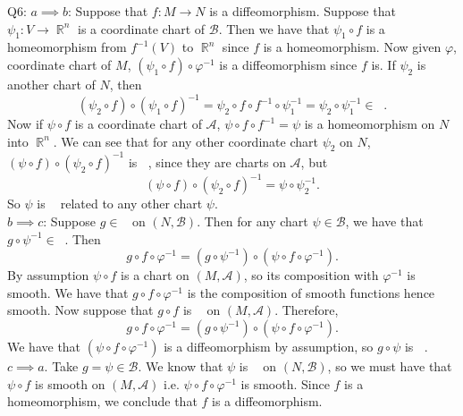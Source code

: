 \documentclass[letterpaper]{article}
\DeclareMathOperator{\smooth}{\mathcal{C}^\infty}
\DeclareMathOperator{\R}{\mathbb{R}}
\begin{document}
 \noindent Q6: 
$a \implies b$: Suppose that $f:M\to N$ is a diffeomorphism.
 Suppose that $\psi_1 : V \to \R^n$ is a coordinate chart of $\mathcal{B}$. 
 Then we have that $\psi_1\circ f$ is a homeomorphism from $f^{-1}(V)$ to $\R^n$ since $f$ is a homeomorphism.
Now given $\varphi$, coordinate chart of $M$, $(\psi_1 \circ f) \circ \varphi^{-1}$ is a diffeomorphism since $f$ is.  
If $\psi_2$ is another chart of $N$, then $$(\psi_2 \circ f) \circ (\psi_1\circ f)^{-1} = \psi_2 \circ f \circ f^{-1} \circ \psi_1^{-1} = \psi_2 \circ \psi_1^{-1}\in \smooth.$$
Now if $\psi\circ f$ is a coordinate chart of $\mathcal{A}$, $\psi \circ f \circ f^{-1} = \psi$ is a homeomorphism on $N$ into $\R^n$. 
We can see that for any other coordinate chart $\psi_2$ on $N$, $(\psi\circ f)\circ(\psi_2 \circ f)^{-1}$ is $\smooth$, since they are charts on $\mathcal{A}$, but $$(\psi\circ f)\circ(\psi_2 \circ f)^{-1} = \psi \circ \psi_2^{-1}.$$ 
So $\psi$ is $\smooth$ related to any other chart $\psi$. 
\newline \\ $b \implies c$: Suppose $g \in \smooth$ on $(N, \mathcal{B})$. Then for any chart $\psi\in \mathcal{B}$, we have that $g\circ \psi^{-1} \in \smooth$. Then $$g\circ f \circ \varphi^{-1} = (g\circ \psi^{-1}) \circ (\psi \circ f \circ \varphi^{-1}).$$ By assumption $\psi \circ f$ is a chart on $(M , \mathcal{A})$, so its composition with $\varphi^{-1}$ is smooth. 
We have that $g\circ f \circ \varphi^{-1}$ is the composition of smooth functions hence smooth. Now suppose that $g\circ f$ is $\smooth$ on $(M, \mathcal{A})$. 
Therefore, $$g \circ f \circ \varphi^{-1} = (g \circ \psi^{-1}) \circ ( \psi \circ f \circ \varphi^{-1}). $$ We have that $( \psi \circ f \circ \varphi^{-1})$ is a diffeomorphism by assumption, so $g\circ \psi$ is $\smooth$.
\newline \\ $c \implies a$. Take $g = \psi \in \mathcal{B}$. We know that $\psi$ is $\smooth$ on $(N, \mathcal{B})$, so we must have that $\psi \circ f$ is smooth on $(M, \mathcal{A})$ i.e. $\psi \circ f \circ \varphi^{-1}$ is smooth. Since $f$ is a homeomorphism, we conclude that $f$ is a diffeomorphism.  
\end{document}
